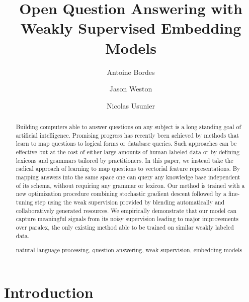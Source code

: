 \documentclass[runningheads,a4paper]{llncs}
\newcommand{\keywords}[1]{\par\addvspace\baselineskip
\noindent\keywordname\enspace\ignorespaces#1}
\begin{document}
\mainmatter  
\title{Open Question Answering  with Weakly Supervised Embedding Models}




\author{Antoine Bordes
\and Jason Weston \and Nicolas Usunier}



\maketitle


\begin{abstract}
Building computers able to answer questions on any subject is a long standing goal of artificial intelligence.
Promising progress has recently been achieved by methods that learn to map questions to logical forms or database queries.
Such approaches can be effective but at the cost of 
either large amounts of human-labeled data or by 
defining lexicons and grammars tailored by practitioners.
In this paper, we instead take the radical approach of learning to map questions to vectorial feature representations. By mapping answers into the same space one can query any knowledge base 
independent of its schema, without requiring any grammar or lexicon.
Our method is trained with a new optimization procedure combining stochastic gradient descent followed by a fine-tuning step using the weak supervision provided by blending automatically and collaboratively generated resources.
We empirically demonstrate that our model can capture meaningful signals from its noisy supervision leading to major improvements over {\sc paralex}, the only existing method able to be trained 
on similar weakly labeled data.
\keywords{natural language processing, question answering, weak supervision, embedding models}
\end{abstract}


\section{Introduction}
\label{sec:intro}
\end{document}
